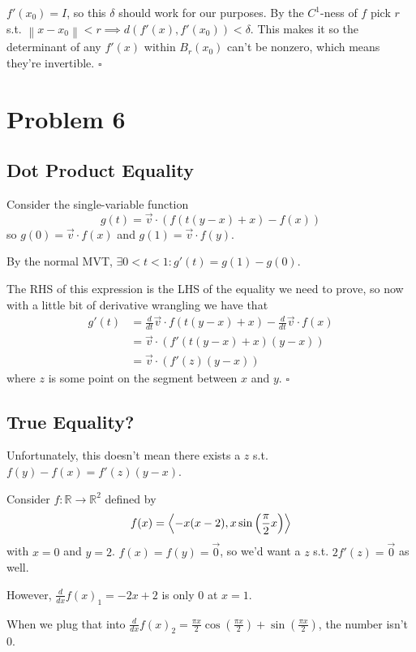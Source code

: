 \documentclass[12pt]{article}
\newcommand{\R}{\mathbb{R}}
\newcommand{\norm}[1]{\left\lVert#1\right\rVert}
\begin{document}
$f'(x_0)=I$, so this $\delta$ should work for our purposes.
By the $C^1$-ness of $f$ pick $r$ s.t. $\norm{x-x_0} < r \implies d(f'(x), f'(x_0)) < \delta$. 
This makes it so the determinant of any $f'(x)$ within $B_r(x_0)$ can't be nonzero,
which means they're invertible. $\square$

\pagebreak

\section{Problem 6}

\subsection{Dot Product Equality}

Consider the single-variable function
\[g(t)=\vec{v} \cdot (f(t(y-x)+x)-f(x))\]
so $g(0)=\vec{v} \cdot f(x)$ and $g(1)=\vec{v} \cdot f(y)$.

By the normal MVT, $\exists 0 < t < 1: g'(t)=g(1) - g(0)$.

The RHS of this expression is the LHS of the equality we need to prove,
so now with a little bit of derivative wrangling we have that
\begin{align*}
  g'(t)
   & = \frac{d}{dt} \vec{v} \cdot f(t(y-x)+x) - \frac{d}{dt} \vec{v} \cdot f(x) \\
   & = \vec{v} \cdot (f'(t(y-x)+x)(y-x))                                        \\
   & = \vec{v} \cdot (f'(z)(y-x))
\end{align*}
where $z$ is some point on the segment between $x$ and $y$. $\square$

\subsection{True Equality?}

Unfortunately, this doesn't mean there exists a $z$ s.t. $f(y)-f(x)=f'(z)(y-x)$.

Consider $f: \R \to \R^2$ defined by
\[f(x)=\Braket{-x(x-2), x\sin\left(\frac{\pi}{2}x\right)}\]
with $x=0$ and $y=2$.
$f(x)=f(y)=\vec{0}$, so we'd want a $z$ s.t. $2f'(z)=\vec{0}$ as well.

However, $\frac{d}{dx} f(x)_1=-2x+2$ is only $0$ at $x=1$.

When we plug that into
$\frac{d}{dx} f(x)_2=\frac{\pi x}{2}\cos\left(\frac{\pi x}{2}\right)+\sin\left(\frac{\pi x}{2}\right)$,
the number isn't $0$.
\end{document}
